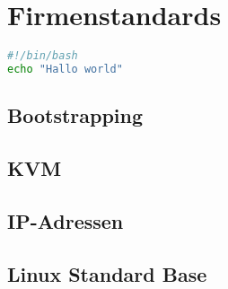 \chapter{Firmenstandards}
\begin{lstlisting}[language=bash, caption=blabla]
#!/bin/bash
echo "Hallo world"
\end{lstlisting}
\section{Bootstrapping}
\section{KVM}
\section{IP-Adressen}
\section{Linux Standard Base}
